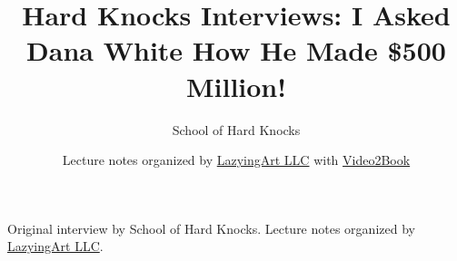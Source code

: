 \documentclass[11pt,oneside]{book}
\begin{document}
\frontmatter
\title{Hard Knocks Interviews: I Asked Dana White How He Made \$500 Million!}
\author{School of Hard Knocks}
\date{Lecture notes organized by \href{https://lazying.art}{LazyingArt LLC} with \href{https://github.com/lachlanchen/Video2Book}{Video2Book}}
\maketitle
\begin{center}
\small Original interview by School of Hard Knocks. Lecture notes organized by \href{https://lazying.art}{LazyingArt LLC}.
\end{center}
\clearpage
\mainmatter

\end{document}
